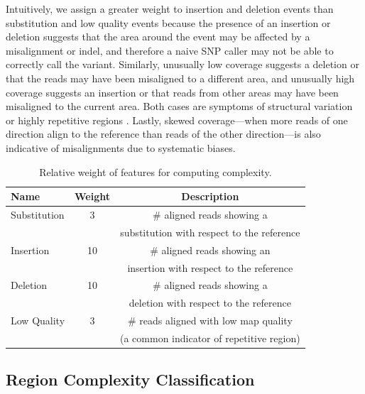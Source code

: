 \documentclass[10pt]{article}
\newcommand\TODO[1]{\textcolor{red}{TODO: #1}}
\begin{document}
Intuitively, we assign a greater weight to insertion and deletion events than substitution and low quality events because the presence of an insertion or deletion suggests that the area around the event may be affected by a misalignment or indel, and therefore a naive SNP caller may not be able to correctly call the variant.
Similarly, unusually low coverage suggests a deletion or that the reads may have been misaligned to a different area, and unusually high coverage suggests an insertion or that reads from other areas may have been misaligned to the current area.
Both cases are symptoms of structural variation or highly repetitive regions \cite{structuralVar}.
Lastly, skewed coverage---when more reads of one direction align to the reference than reads of the other direction---is also indicative of misalignments due to systematic biases.
\begin{table}[h!]
\tiny
  \centering
	\begin{tabular}{|l|c|c|}
    \hline Name & Weight & Description \\\hline
    Substitution & 3 & $\#$ aligned reads showing a \\ && substitution with respect to the reference\\\hline
    Insertion & 10 & $\#$ aligned reads showing an \\ && insertion with respect to the reference\\\hline
    Deletion & 10 & $\#$ aligned reads showing a \\ && deletion with respect to the reference\\\hline
    Low Quality & 3 & $\#$ reads aligned with low map quality \\ && (a common indicator of repetitive region)\\\hline
  \end{tabular}
  \caption{Relative weight of features for computing complexity.}
  \label{complexity}
\end{table}


\subsection{Region Complexity Classification}
\end{document}
